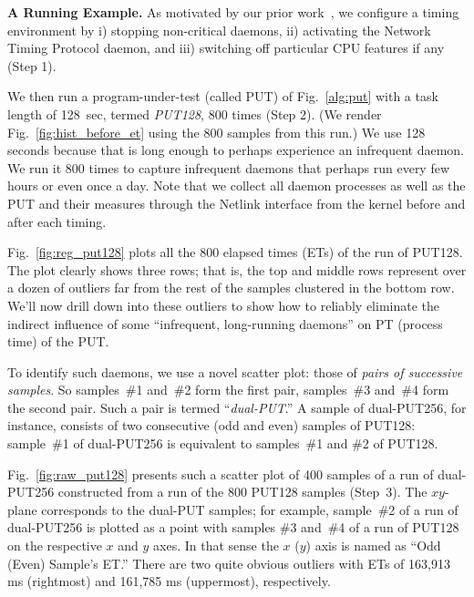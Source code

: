 \documentclass[letter]{ieice}
\begin{document}
{\bf A Running Example.} 
As motivated by our prior work~\cite{Currim}, 
we configure a timing environment by i) stopping non-critical daemons, 
ii) activating the Network Timing Protocol daemon, and 
iii) switching off particular CPU features\cite{intel15,intelSpeed15} if any (Step 1). 

We then run a program-under-test (called PUT) of 
Fig.~\ref{alg:put} with a task length of 128~sec, 
termed {\em PUT128}, 800 times (Step 2). 
(We render Fig.~\ref{fig:hist_before_et} using the 800 samples from this run.)
We use 128 seconds because that is long enough to perhaps experience an infrequent daemon. 
We run it 800 times to capture infrequent daemons that perhaps run every few hours or even 
once a day. 
Note that we collect all daemon processes as well as the PUT and their measures 
through the Netlink interface from the kernel before and after each 
timing.

Fig.~\ref{fig:reg_put128} plots all the 800 elapsed times (ETs) of the run of PUT128.
The plot clearly shows three rows; that is, 
the top and middle rows represent over a dozen of outliers far from 
the rest of the samples clustered in the bottom row. 
We'll now drill down into these outliers to 
show how to reliably eliminate the indirect influence of 
some ``infrequent, long-running daemons'' on PT (\hbox{process} time) of the PUT.

To identify such daemons, we use a novel \hbox{scatter} plot: 
those of {\em pairs of successive samples}{\color{red}. 
So \hbox{samples}~\#{1} and~\#{2} form the first pair, 
samples~\#{3} and~\#{4} form the second pair.
Such a pair is termed ``\hbox{{\it dual-PUT}}.'' 
A sample of \hbox{dual-PUT256}, for instance, 
consists of two consecutive (odd and even) 
samples of PUT128: 
sample~\#{1} of dual-PUT256 is equivalent 
to samples~\#{1} and \#{2} of PUT128.}

Fig.~\ref{fig:raw_put128} presents such a scatter plot 
of 400 samples of a run of \hbox{dual-PUT256} constructed 
from a run of the 800 PUT128 samples (Step~3). 
{\color{red} The $xy$-plane corresponds to the dual-PUT samples; 
for example, \hbox{sample}~\#{2} of a run of dual-PUT256 
is plotted as a point with samples \#{3} and~\#{4} of a run of PUT128 
on the respective $x$ and $y$ axes. In that sense 
the $x$ ($y$) axis is named as ``Odd (Even) Sample's ET.''}
There are two quite obvious outliers with ETs 
of 163,913 ms (rightmost) and 161,785 ms (uppermost), respectively.
\end{document}

